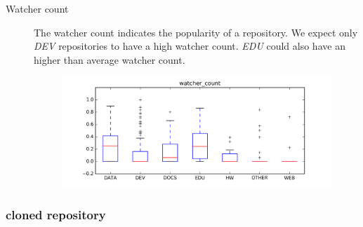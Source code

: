 \documentclass[a4paper]{scrartcl}
\begin{document}
\begin{description}
			\item[Watcher count]
				The watcher count indicates the popularity of a repository. We expect only \emph{DEV} repositories to have a high watcher count. \emph{EDU} could also have an higher than average watcher count.
				\begin{figure}[h!]
					\centering
					\includegraphics[width=0.75\linewidth]{figures/watcher_count.png}
				\end{figure}
		\end{description}
		

		\subsubsection{cloned repository} %
		\label{ssub:cloned_repository}

		
\end{document}

